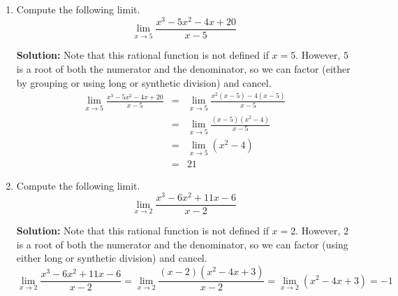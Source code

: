 \documentclass{article}
\begin{document}
\begin{enumerate}
  
\vspace{1cm}

\item Compute the following limit. \[ \lim_{x \rightarrow 5} \frac{x^3 - 5x^2 - 4x + 20}{x - 5} \]

\textbf{Solution:} Note that this rational function is not defined if $x = 5$. However, $5$ is a root of both the numerator and the denominator, so we can factor (either by grouping or using long or synthetic division) and cancel.
\begin{eqnarray*}
\lim_{x \rightarrow 5} \frac{x^3 - 5x^2 - 4x + 20}{x - 5} & = & \lim_{x \rightarrow 5} \frac{x^2(x - 5) - 4(x - 5)}{x - 5} \\
 & = & \lim_{x \rightarrow 5} \frac{(x - 5)(x^2 - 4)}{x - 5} \\
 & = & \lim_{x \rightarrow 5} (x^2 - 4) \\
 & = & 21
\end{eqnarray*}


  
\vspace{1cm}

\item Compute the following limit. \[ \lim_{x \rightarrow 2} \frac{x^3 - 6x^2 + 11x - 6}{x - 2} \]

\textbf{Solution:} Note that this rational function is not defined if $x = 2$. However, $2$ is a root of both the numerator and the denominator, so we can factor (using either long or synthetic division) and cancel.
\[ \lim_{x \rightarrow 2} \frac{x^3 - 6x^2 + 11x - 6}{x - 2} = \lim_{x \rightarrow 2} \frac{(x - 2)(x^2 - 4x + 3)}{x - 2} = \lim_{x \rightarrow 2} (x^2 - 4x + 3) = -1 \]


  
\vspace{1cm}
\end{enumerate}
\end{document}

